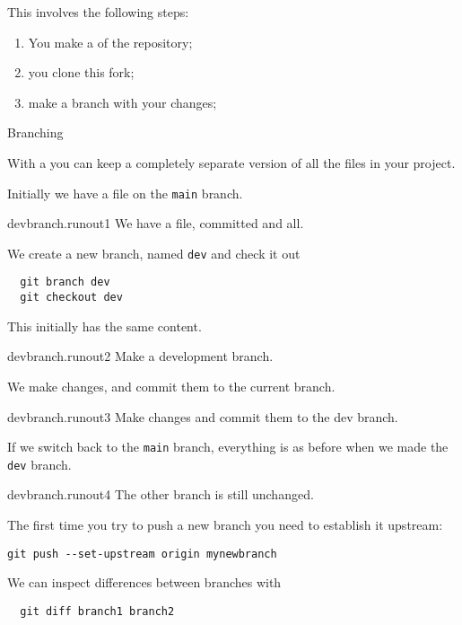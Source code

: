 This involves the following steps:
\begin{enumerate}
\item You make a  of the repository;
\item you clone this fork;
\item make a branch with your changes;
\end{enumerate}

\newpage
{} {Branching}

With a  you can keep a completely
separate version of all the files in your project.

Initially we have a file on the \lstinline{main} branch.

\begin{gitstep}{devbranch.runout1}
  We have a file, committed and all.
\end{gitstep}

We create a new branch, named \lstinline{dev}
and check it out
\begin{lstlisting}
  git branch dev
  git checkout dev
\end{lstlisting}
This initially has the same content.

\begin{gitstep}{devbranch.runout2}
  Make a development branch.
\end{gitstep}

We make changes, and commit them to the current branch.

\begin{gitstep}{devbranch.runout3}
  Make changes and commit them to the dev branch.
\end{gitstep}

If we switch back to the \lstinline{main} branch,
everything is as before when we made the \lstinline{dev} branch.

\begin{gitstep}{devbranch.runout4}
  The other branch is still unchanged.
\end{gitstep}

The first time you try to push a new branch
you need to establish it upstream:
\begin{lstlisting}
git push --set-upstream origin mynewbranch
\end{lstlisting}

We can inspect differences between branches with 
\begin{lstlisting}
  git diff branch1 branch2
\end{lstlisting}

